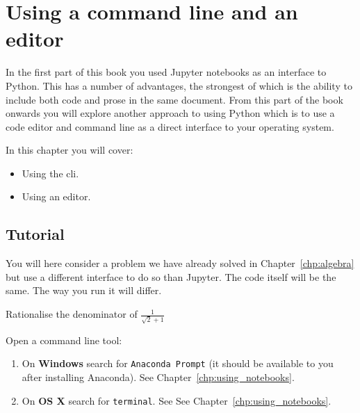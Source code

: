 \chapter{Using a command line and an editor}
\label{chp:cli}

In the first part of this book you used Jupyter notebooks as an interface to
Python. This has a number of advantages, the strongest of which is the ability
to include both code and prose in the same document. From this part of the book
onwards you will explore another approach to using Python which is to use 
a code editor and command line as a direct interface to your operating system.

\begin{note}
In this chapter you will cover:
\begin{itemize}
\item 

Using the cli.

\item 

Using an editor.

\end{itemize}
\end{note}





\section{Tutorial}

You will here consider a problem we have already solved in
Chapter~\ref{chp:algebra}
 but use a different interface to do so than Jupyter.
The code itself will be the same. The way you run it will differ.

Rationalise the denominator of \(\frac{1}{\sqrt{2} + 1}\)

Open a command line tool:

\begin{enumerate}

\item 

On \textbf{Windows} search for \texttt{Anaconda Prompt} (it should be available to you
after installing Anaconda). See Chapter~\ref{chp:using_notebooks}.

\item 

On \textbf{OS X} search for \texttt{terminal}. See
See Chapter~\ref{chp:using_notebooks}.


\end{enumerate}

